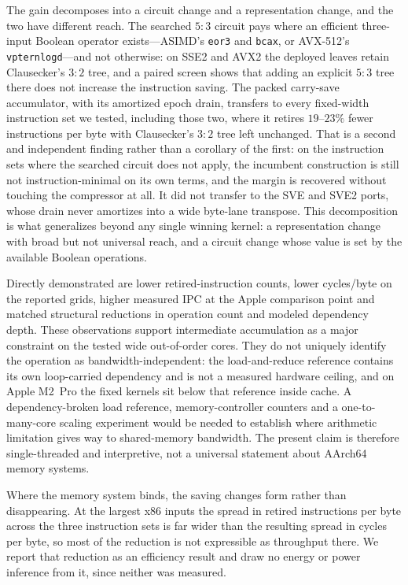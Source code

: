 \documentclass[fleqn,10pt]{wlscirep}
\begin{document}
The gain decomposes into a circuit change and a representation change, and the two have different reach. The searched $5{:}3$ circuit pays where an efficient three-input Boolean operator exists---ASIMD's \texttt{eor3} and \texttt{bcax}, or AVX-512's \texttt{vpternlogd}---and not otherwise: on SSE2 and AVX2 the deployed leaves retain Clausecker's $3{:}2$ tree, and a paired screen shows that adding an explicit $5{:}3$ tree there does not increase the instruction saving. The packed carry-save accumulator, with its amortized epoch drain, transfers to every fixed-width instruction set we tested, including those two, where it retires $19$--$23\%$ fewer instructions per byte with Clausecker's $3{:}2$ tree left unchanged. That is a second and independent finding rather than a corollary of the first: on the instruction sets where the searched circuit does not apply, the incumbent construction is still not instruction-minimal on its own terms, and the margin is recovered without touching the compressor at all. It did not transfer to the SVE and SVE2 ports, whose drain never amortizes into a wide byte-lane transpose. This decomposition is what generalizes beyond any single winning kernel: a representation change with broad but not universal reach, and a circuit change whose value is set by the available Boolean operations.

Directly demonstrated are lower retired-instruction counts, lower cycles/byte on the reported grids, higher measured IPC at the Apple comparison point and matched structural reductions in operation count and modeled dependency depth. These observations support intermediate accumulation as a major constraint on the tested wide out-of-order cores. They do not uniquely identify the operation as bandwidth-independent: the load-and-reduce reference contains its own loop-carried dependency and is not a measured hardware ceiling, and on Apple M2~Pro the fixed kernels sit below that reference inside cache. A dependency-broken load reference, memory-controller counters and a one-to-many-core scaling experiment would be needed to establish where arithmetic limitation gives way to shared-memory bandwidth. The present claim is therefore single-threaded and interpretive, not a universal statement about AArch64 memory systems.

Where the memory system binds, the saving changes form rather than disappearing. At the largest x86 inputs the spread in retired instructions per byte across the three instruction sets is far wider than the resulting spread in cycles per byte, so most of the reduction is not expressible as throughput there. We report that reduction as an efficiency result and draw no energy or power inference from it, since neither was measured.
\end{document}
